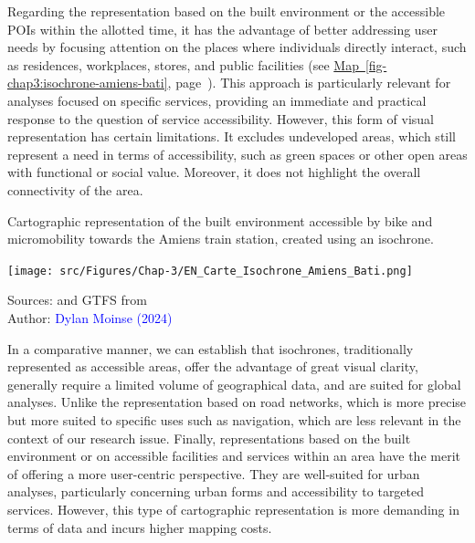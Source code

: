 \begin{refsegment}
Regarding the representation based on the built environment or the accessible \acrshort{POIs} within the allotted time, it has the advantage of better addressing user needs by focusing attention on the places where individuals directly interact, such as residences, workplaces, stores, and public facilities (see \hyperref[fig-chap3:isochrone-amiens-bati]{Map~\ref{fig-chap3:isochrone-amiens-bati}}, page~\pageref{fig-chap3:isochrone-amiens-bati}). This approach is particularly relevant for analyses focused on specific services, providing an immediate and practical response to the question of service accessibility. However, this form of visual representation has certain limitations. It excludes undeveloped areas, which still represent a need in terms of accessibility, such as green spaces or other open areas with functional or social value. Moreover, it does not highlight the overall connectivity of the area.%

\begin{carte}[h!]\vspace*{4pt}
    \caption{Cartographic representation of the built environment accessible by bike and micromobility towards the Amiens train station, created using an isochrone.}
    \label{fig-chap3:isochrone-amiens-bati}
    \centerline{\texttt{[image: src/Figures/Chap-3/EN\_Carte\_Isochrone\_Amiens\_Bati.png]}}
    \vspace{5pt}
    \begin{flushright}\scriptsize{
    Sources: \textcolor{blue}{\textcite{openstreetmap_openstreetmap_2023}} and \acrshort{GTFS} from \textcolor{blue}{\textcite{sncf_reseau_2024}}
    \\
    Author: \textcolor{blue}{Dylan Moinse (2024)}
    }\end{flushright}
\end{carte}

In a comparative manner, we can establish that isochrones, traditionally represented as accessible areas, offer the advantage of great visual clarity, generally require a limited volume of geographical data, and are suited for global analyses. Unlike the representation based on road networks, which is more precise but more suited to specific uses such as navigation, which are less relevant in the context of our research issue. Finally, representations based on the built environment or on accessible facilities and services within an area have the merit of offering a more user-centric perspective. They are well-suited for urban analyses, particularly concerning urban forms and accessibility to targeted services. However, this type of cartographic representation is more demanding in terms of data and incurs higher mapping costs.%


\end{refsegment}
